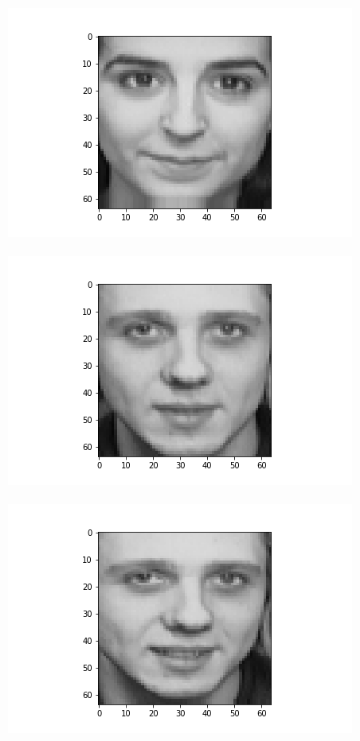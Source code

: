 \documentclass[12pt, a4paper]{article}
\begin{document}
\begin{figure}[h]
\begin{subfigure}{0.3\linewidth}
    \end{subfigure}
    \newline
    \begin{subfigure}{0.3\linewidth}
        \centering
        \includegraphics[width=\linewidth]{images/q3/c/0/3.png}
    \end{subfigure}
    \hfill
    \begin{subfigure}{0.3\linewidth}
        \centering
        \includegraphics[width=\linewidth]{images/q3/c/0/4.png}
    \end{subfigure}
    \hfill
    \begin{subfigure}{0.3\linewidth}
        \centering
        \includegraphics[width=\linewidth]{images/q3/c/0/5.png}

\end{subfigure}
\end{figure}
\end{document}
